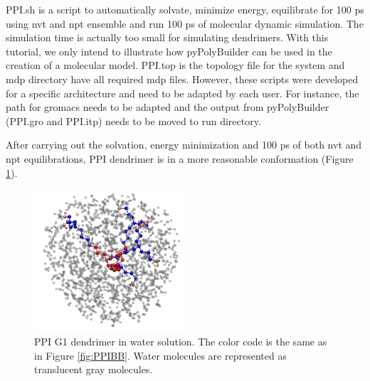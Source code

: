 PPI.sh is a script to automatically solvate, minimize energy, equilibrate for 100 ps using nvt and npt ensemble and run 100 ps of molecular dynamic simulation.
The simulation time is actually too small for simulating dendrimers. With this tutorial, we only intend to illustrate how pyPolyBuilder can be used in the creation of a molecular model.
PPI.top is the topology file for the system and mdp directory have all required mdp files.
However, these scripts were developed for a specific architecture and need to be adapted by each user.
For instance, the path for gromacs needs to be adapted and the output from pyPolyBuilder (PPI.gro and PPI.itp) needs to be moved to run directory.

After carrying out the solvation, energy minimization and 100 ps of both nvt and npt equilibrations, PPI dendrimer is in a more reasonable conformation (Figure \ref{fig:PPIG1SOL}).

\begin{figure}
    \centering
    \includegraphics[width=0.5\textwidth]{PPI/PPISOL.pdf}
    \caption{PPI G1 dendrimer in water solution.
             The color code is the same as in Figure \ref{fig:PPIBB}.
             Water molecules are represented as translucent gray molecules.}
    \label{fig:PPIG1SOL}
\end{figure}
